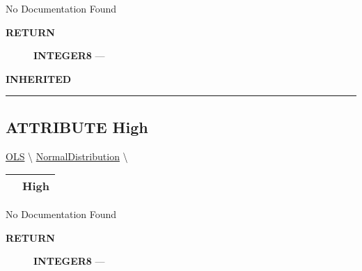 \par





No Documentation Found








\par
\begin{description}
\item [\colorbox{tagtype}{\color{white} \textbf{\textsf{RETURN}}}] \textbf{INTEGER8} --- 
\end{description}






\par
\begin{description}
\item [\colorbox{tagtype}{\color{white} \textbf{\textsf{INHERITED}}}] 
\end{description}



\rule{\linewidth}{0.5pt}
\subsection*{\textsf{\colorbox{headtoc}{\color{white} ATTRIBUTE}
High}}

\hypertarget{ecldoc:linearregression.ols.distributionbase.high}{}
\hspace{0pt} \hyperlink{ecldoc:linearregression.ols}{OLS} \textbackslash 
\hspace{0pt} \hyperlink{ecldoc:linearregression.ols.normaldistribution}{NormalDistribution} \textbackslash 

{\renewcommand{\arraystretch}{1.5}
\begin{tabularx}{\textwidth}{|>{\raggedright\arraybackslash}l|X|}
\hline
\hspace{0pt}\mytexttt{\color{red} } & \textbf{High} \\
\hline
\end{tabularx}
}

\par





No Documentation Found








\par
\begin{description}
\item [\colorbox{tagtype}{\color{white} \textbf{\textsf{RETURN}}}] \textbf{INTEGER8} --- 
\end{description}






